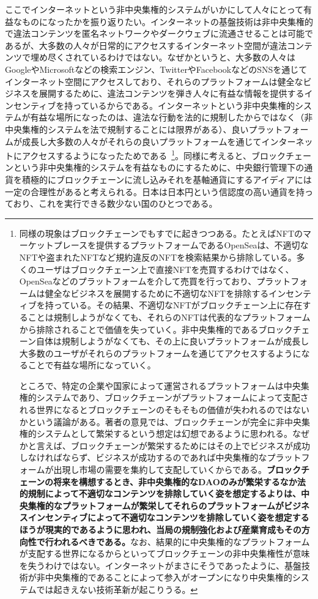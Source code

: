 \documentclass[dvipdfmx,a4paper]{jsarticle}
\begin{document}
ここでインターネットという非中央集権的システムがいかにして人々にとって有益なものになったかを振り返りたい。インターネットの基盤技術は非中央集権的で違法コンテンツを匿名ネットワークやダークウェブに流通させることは可能であるが、大多数の人々が日常的にアクセスするインターネット空間が違法コンテンツで埋め尽くされているわけではない。なぜかというと、大多数の人々はGoogleやMicrosoftなどの検索エンジン、TwitterやFacebookなどのSNSを通じてインターネット空間にアクセスしており、それらのプラットフォームは健全なビジネスを展開するために、違法コンテンツを弾き人々に有益な情報を提供するインセンティブを持っているからである。インターネットという非中央集権的システムが有益な場所になったのは、違法な行動を法的に規制したからではなく（非中央集権的システムを法で規制することには限界がある）、良いプラットフォームが成長し大多数の人々がそれらの良いプラットフォームを通じてインターネットにアクセスするようになったためである~\footnote{同様の現象はブロックチェーンでもすでに起きつつある。たとえばNFTのマーケットプレースを提供するプラットフォームであるOpenSeaは、不適切なNFTや盗まれたNFTなど規約違反のNFTを検索結果から排除している。多くのユーザはブロックチェーン上で直接NFTを売買するわけではなく、OpenSeaなどのプラットフォームを介して売買を行っており、プラットフォームは健全なビジネスを展開するために不適切なNFTを排除するインセンティブを持っている。その結果、不適切なNFTがブロックチェーン上に存在することは規制しようがなくても、それらのNFTは代表的なプラットフォームから排除されることで価値を失っていく。非中央集権的であるブロックチェーン自体は規制しようがなくても、その上に良いプラットフォームが成長し大多数のユーザがそれらのプラットフォームを通じてアクセスするようになることで有益な場所になっていく。
  
ところで、特定の企業や国家によって運営されるプラットフォームは中央集権的システムであり、ブロックチェーンがプラットフォームによって支配される世界になるとブロックチェーンのそもそもの価値が失われるのではないかという議論がある。著者の意見では、ブロックチェーンが完全に非中央集権的システムとして繁栄するという想定は幻想であるように思われる。なぜかと言えば、ブロックチェーンが繁栄するためにはその上でビジネスが成功しなければならず、ビジネスが成功するのであれば中央集権的なプラットフォームが出現し市場の需要を集約して支配していくからである。\textbf{ブロックチェーンの将来を構想するとき、非中央集権的なDAOのみが繁栄するなか法的規制によって不適切なコンテンツを排除していく姿を想定するよりは、中央集権的なプラットフォームが繁栄してそれらのプラットフォームがビジネスインセンティブによって不適切なコンテンツを排除していく姿を想定するほうが現実的であるように思われ、当局の規制強化および産業育成もその方向性で行われるべきである。}なお、結果的に中央集権的なプラットフォームが支配する世界になるからといってブロックチェーンの非中央集権性が意味を失うわけではない。インターネットがまさにそうであったように、基盤技術が非中央集権的であることによって参入がオープンになり中央集権的システムでは起きえない技術革新が起こりうる。}。同様に考えると、ブロックチェーンという非中央集権的システムを有益なものにするために、中央銀行管理下の通貨を積極的にブロックチェーンに流し込みそれを基軸通貨にするアイディアには一定の合理性があると考えられる。日本は日本円という信認度の高い通貨を持っており、これを実行できる数少ない国のひとつである。
\end{document}
